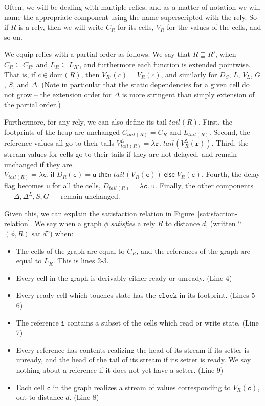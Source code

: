 \documentclass[preprint]{sigplanconf}
\newcommand{\dom}[1]{\mathrm{dom}({#1})}
\newcommand{\term}[1]{\ensuremath{\mathtt{{#1}}}}
\newcommand{\fun}[2]{\lambda {#1}.\;{#2}}
\newcommand{\U}{\mathsf{u}}
\newcommand{\tail}[2][]{\mathit{tail}^{#1}(#2)}
\newcommand{\satisfy}[2]{{#1}\;\mathrm{sat}\;{#2}}
\begin{document}
Often, we will be dealing with multiple relies, and as a matter of
notation we will name the appropriate component using the name
superscripted with the rely. So if $R$ is a rely, then we will write
$C_R$ for its cells, $V_R$ for the values of the cells, and so on.

We equip relies with a partial order as follows. We say that $R
\sqsubseteq R'$, when $C_R \subseteq C_{R'}$ and $L_R \subseteq L_{R'}$, and
furthermore each function is extended pointwise. That is, if $c \in
\dom{R}$, then $V_{R'}(c) = V_{R}(c)$, and similarly for $D_S$, $L$,
$V_L$, $G$, $S$, and $\Delta$. (Note in particular that the static
dependencies for a given cell do not grow -- the extension order for
$\Delta$ is more stringent than simply extension of the partial order.)

Furthermore, for any rely, we can also define its tail
$\tail{R}$. First, the footprints of the heap are unchanged
$C_{\tail{R}} = C_R$ and $L_{\tail{R}}$. Second, the reference values
all go to their tails $V^L_{\tail{R}} =
\fun{\term{r}}{\tail{V^L_R(\term{r})}}$.  Third, the stream values for
cells go to their tails if they are not delayed, and remain unchanged
if they are. $V_{\tail{R}} = \fun{\term{c}}{\mathsf{if}\;D_R(\term{c})
  =
  \U\;\mathsf{then}\;\tail{V_R(\term{c})}\;\mathsf{else}\;V_R(\term{c})}$.
Fourth, the delay flag becomes $\U$ for all the cells, $D_{\tail{R}} = \fun{\term{c}}{\U}$. 
Finally, the other components --- $\Delta, \Delta^L, S, G$ --- remain unchanged. 

Given this, we can explain the satisfaction relation in
Figure~\ref{satisfaction-relation}. We say when a graph $\phi$
\emph{satisfies} a rely $R$ to distance $d$, (written
``$\satisfy{(\phi, R)}{d}$'') when:
\begin{itemize}
  \item The cells of the graph are equal to $C_R$, and the references
    of the graph are equal to $L_R$. This is lines 2-3. 
  \item Every cell in the graph is derivably either ready or unready. (Line 4)
  \item Every ready cell which touches state has the \term{clock} in its
    footprint. (Lines 5-6)
  \item The reference \term{i} contains a subset of the cells which 
    read or write state. (Line 7)
  \item Every reference has contents realizing the head of its
    stream if its setter is unready, and the head of the tail of its
    stream if its setter is ready. We say nothing about a reference
    if it does not yet have a setter. (Line 9)
  \item Each cell \term{c} in the graph realizes a stream of values corresponding
    to $V_R(\term{c})$, out to distance $d$. (Line 8)
\end{itemize}
\end{document}
